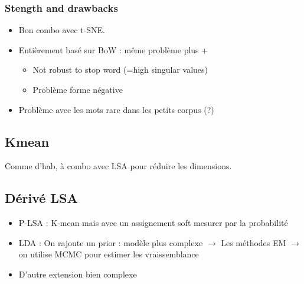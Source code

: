 \documentclass{article}
\theoremstyle{plain}%
\theoremstyle{definition}
\theoremstyle{remark}
\begin{document}
\subsubsection{Stength and drawbacks}
\begin{itemize}
    \item Bon combo avec t-SNE.
    \item Entièrement basé sur BoW : même problème  plus +\begin{itemize}
        \item Not robust to stop word (=high singular values)
        \item Problème forme négative 
    \end{itemize}
    \item Problème avec les mots rare dans les petits corpus (?)
\end{itemize}

\subsection{Kmean}
Comme d'hab, à combo avec LSA pour réduire les dimensions. 
\subsection{Dérivé LSA}
\begin{itemize}
    \item P-LSA : K-mean mais avec un assignement soft mesurer par la probabilité
    \item LDA : On rajoute un prior : modèle plus complexe $\rightarrow$ Les méthodes EM  $\rightarrow$ on utilise MCMC pour estimer les vraissemblance
    \item D'autre extension bien complexe
\end{itemize}
\end{document}
